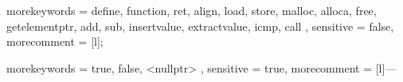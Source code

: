 
\graphicspath{{fig/}}

\usepackage{multicol}

\usepackage{listings}
\usepackage{syntax}
\usepackage{algorithm}
\usepackage{algpseudocode}

\usepackage{mdwlist}
\usepackage{tablefootnote}

\usepackage{multirow}

\usepackage{todonotes}


{
  morekeywords = {
    define, function, ret, align,
    load, store, malloc, alloca, free, getelementptr,
    add, sub, insertvalue, extractvalue, icmp, call
  },
  sensitive    = false,
  morecomment  = [l]{;}
}

{
  morekeywords = {
    true, false, <nullptr>
  },
  sensitive    = true,
  morecomment  = [l]{---}
}



